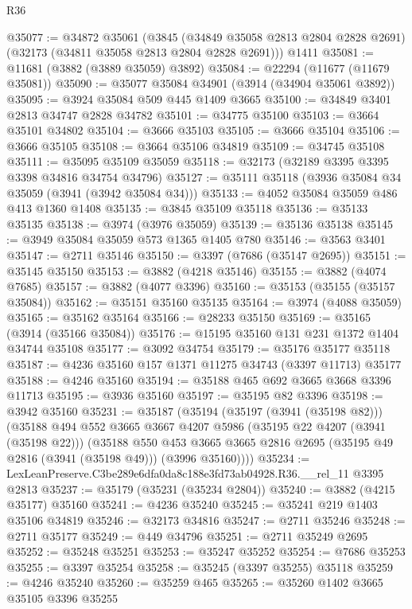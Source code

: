 \begin{lexlean}{R36}
\begin{coremodule}
@35077 := @34872
    @35061
    (@3845 (@34849 @35058 @2813 @2804 @2828 @2691) (@32173 (@34811 @35058 @2813 @2804 @2828 @2691)))
    @1411
@35081 := @11681 (@3882 (@3889 @35059) @3892)
@35084 := @22294 (@11677 (@11679 @35081))
@35090 := @35077 @35084 @34901 (@3914 (@34904 @35061 @3892))
@35095 := @3924 @35084 @509 @445 @1409 @3665
@35100 := @34849 @3401 @2813 @34747 @2828 @34782
@35101 := @34775 @35100
@35103 := @3664 @35101 @34802
@35104 := @3666 @35103
@35105 := @3666 @35104
@35106 := @3666 @35105
@35108 := @3664 @35106 @34819
@35109 := @34745 @35108
@35111 := @35095 @35109 @35059
@35118 := @32173 (@32189 @3395 @3395 @3398 @34816 @34754 @34796)
@35127 := @35111 @35118 (@3936 @35084 @34 @35059 (@3941 (@3942 @35084 @34)))
@35133 := @4052 @35084 @35059 @486 @413 @1360 @1408
@35135 := @3845 @35109 @35118
@35136 := @35133 @35135
@35138 := @3974 (@3976 @35059)
@35139 := @35136 @35138
@35145 := @3949 @35084 @35059 @573 @1365 @1405 @780
@35146 := @3563 @3401
@35147 := @2711 @35146
@35150 := @3397 (@7686 (@35147 @2695))
@35151 := @35145 @35150
@35153 := @3882 (@4218 @35146)
@35155 := @3882 (@4074 @7685)
@35157 := @3882 (@4077 @3396)
@35160 := @35153 (@35155 (@35157 @35084))
@35162 := @35151 @35160 @35135
@35164 := @3974 (@4088 @35059)
@35165 := @35162 @35164
@35166 := @28233 @35150
@35169 := @35165 (@3914 (@35166 @35084))
@35176 := @15195 @35160 @131 @231 @1372 @1404 @34744 @35108
@35177 := @3092 @34754
@35179 := @35176 @35177 @35118
@35187 := @4236 @35160 @157 @1371 @11275 @34743 (@3397 @11713) @35177
@35188 := @4246 @35160
@35194 := @35188 @465 @692 @3665 @3668 @3396 @11713
@35195 := @3936 @35160
@35197 := @35195 @82 @3396
@35198 := @3942 @35160
@35231 := @35187
    (@35194
      (@35197 (@3941 (@35198 @82)))
      (@35188
        @494
        @552
        @3665
        @3667
        @4207
        @5986
        (@35195 @22 @4207 (@3941 (@35198 @22)))
        (@35188
          @550
          @453
          @3665
          @3665
          @2816
          @2695
          (@35195 @49 @2816 (@3941 (@35198 @49)))
          (@3996 @35160))))
@35234 := LexLeanPreserve.C3be289e6dfa0da8c188e3fd73ab04928.R36.__rel_11 @3395 @2813
@35237 := @35179 (@35231 (@35234 @2804))
@35240 := @3882 (@4215 @35177) @35160
@35241 := @4236 @35240
@35245 := @35241 @219 @1403 @35106 @34819
@35246 := @32173 @34816
@35247 := @2711 @35246
@35248 := @2711 @35177
@35249 := @449 @34796
@35251 := @2711 @35249 @2695
@35252 := @35248 @35251
@35253 := @35247 @35252
@35254 := @7686 @35253
@35255 := @3397 @35254
@35258 := @35245 (@3397 @35255) @35118
@35259 := @4246 @35240
@35260 := @35259 @465
@35265 := @35260 @1402 @3665 @35105 @3396 @35255

\end{coremodule}
\end{lexlean}
